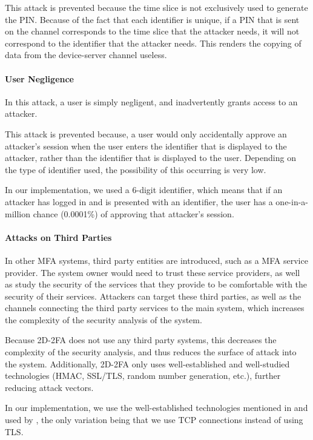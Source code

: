 \documentclass[11pt]{article}
\begin{document}
This attack is prevented because the time slice is not exclusively used
to generate the PIN. Because of the fact that each identifier is unique,
if a PIN that is sent on the channel corresponds to the time slice that
the attacker needs, it will not correspond to the identifier that the
attacker needs. This renders the copying of data from the device-server
channel useless. 


\paragraph{User Negligence}
In this attack, a user is simply negligent, and inadvertently grants
access to an attacker. 

This attack is prevented because, a user would only accidentally approve
an attacker's session when the user enters the identifier that is
displayed to the attacker, rather than the identifier that is displayed
to the user. Depending on the type of identifier used, the possibility
of this occurring is very low.

In our implementation, we used a 6-digit identifier, which means that if
an attacker has logged in and is presented with an identifier, the user
has a one-in-a-million chance (0.0001\%) of approving that attacker's
session. 

\paragraph{Attacks on Third Parties}
In other MFA systems, third party entities are introduced, such as a MFA
service provider. The system owner would need to trust these service
providers, as well as study the security of the services that they
provide to be comfortable with the security of their services. Attackers
can target these third parties, as well as the channels connecting the
third party services to the main system, which increases the complexity
of the security analysis of the system. 

Because 2D-2FA does not use any third party systems, this decreases the
complexity of the security analysis, and thus reduces the surface of
attack into the system. Additionally, 2D-2FA only uses well-established
and well-studied technologies (HMAC, SSL/TLS, random number generation,
etc.), further reducing attack vectors.

In our implementation, we use the well-established technologies
mentioned in and used by \cite{shirvanian2d2fa}, the only variation
being that we use TCP connections instead of using TLS.
\end{document}
